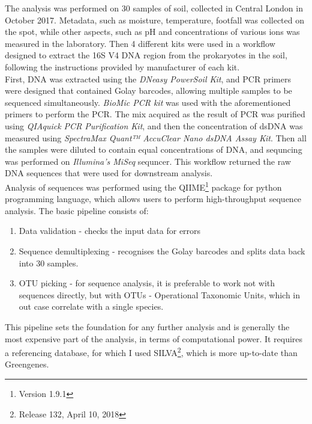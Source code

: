 \documentclass{article}
\begin{document}
\begin{multicols}{2}
The analysis was performed on 30 samples of soil, collected in Central London in October 2017. Metadata, such as moisture, temperature, footfall was collected on the spot, while other aspects, such as pH and concentrations of various ions was measured in the laboratory. Then 4 different kits were used in a workflow designed to extract the 16S V4 DNA region from the prokaryotes in the soil, following the instructions provided by manufacturer of each kit. \\
%
First, DNA was extracted using the \textit{DNeasy PowerSoil Kit}, and PCR primers were designed that contained Golay barcodes, allowing multiple samples to be sequenced simultaneously. \textit{BioMic PCR kit} was used with the aforementioned primers to perform the PCR. The mix acquired as the result of PCR was purified using \textit{QIAquick PCR Purification Kit}, and then the concentration of dsDNA was measured using \textit{SpectraMax Quant™ AccuClear Nano dsDNA Assay Kit}. Then all the samples were diluted to contain equal concentrations of DNA, and sequncing was performed on \textit{Illumina's MiSeq} sequncer. This workflow returned the raw DNA sequences that were used for downstream analysis.\\
%
Analysis of sequences was performed using the QIIME\footnote{Version 1.9.1} package\cite{Caporaso2010,Kuczynski2012} for python programming language, which allows users to perform high-throughput sequence analysis. The basic pipeline consists of:
\begin{enumerate}
	\item Data validation - checks the input data for errors
	\item Sequence demultiplexing - recognises the Golay barcodes and splits data back into 30 samples.
	\item OTU picking - for sequence analysis, it is preferable to work not with sequences directly, but with OTUs - Operational Taxonomic Units, which in out case correlate with a single species.
\end{enumerate}
%
This pipeline sets the foundation for any further analysis and is generally the most expensive part of the analysis, in terms of computational power. It requires a referencing database, for which I used SILVA\cite{Quast2012}\footnote{Release 132, April 10, 2018}, which is more up-to-date than Greengenes\cite{McDonald2012}.\\


\end{multicols}
\end{document}
